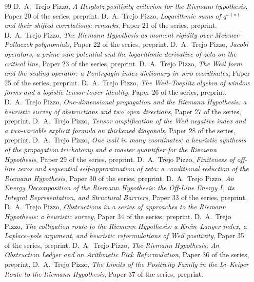 \documentclass[11pt]{amsart}
\theoremstyle{definition}
\theoremstyle{remark}
\numberwithin{equation}{section}
\begin{document}
\begin{thebibliography}{99}
 D.~A.~Trejo Pizzo, \emph{A Herglotz positivity criterion for the Riemann hypothesis}, Paper 20 of the series, preprint.
 D.~A.~Trejo Pizzo, \emph{Logarithmic sums of $q^{\omega(n)}$ and their shifted correlations: remarks}, Paper 21 of the series, preprint.
 D.~A.~Trejo Pizzo, \emph{The Riemann Hypothesis as moment rigidity over Meixner--Pollaczek polynomials}, Paper 22 of the series, preprint.
 D.~A.~Trejo Pizzo, \emph{Jacobi operators, a prime-sum potential and the logarithmic derivative of zeta on the critical line}, Paper 23 of the series, preprint.
 D.~A.~Trejo Pizzo, \emph{The Weil form and the scaling operator: a Pontryagin-index dictionary in zero coordinates}, Paper 25 of the series, preprint.
 D.~A.~Trejo Pizzo, \emph{The Weil--Toeplitz algebra of window forms and a logistic tensor-tower identity}, Paper 26 of the series, preprint.
 D.~A.~Trejo Pizzo, \emph{One-dimensional propagation and the Riemann Hypothesis: a heuristic survey of obstructions and two open directions}, Paper 27 of the series, preprint.
 D.~A.~Trejo Pizzo, \emph{Tensor amplification of the Weil negative index and a two-variable explicit formula on thickened diagonals}, Paper 28 of the series, preprint.
 D.~A.~Trejo Pizzo, \emph{One wall in many coordinates: a heuristic synthesis of the propagation trichotomy and a master quantifier for the Riemann Hypothesis}, Paper 29 of the series, preprint.
 D.~A.~Trejo Pizzo, \emph{Finiteness of off-line zeros and sequential self-approximation of zeta: a conditional reduction of the Riemann Hypothesis}, Paper 30 of the series, preprint.
 D.~A.~Trejo Pizzo, \emph{An Energy Decomposition of the Riemann Hypothesis: the Off-Line Energy $I$, its Integral Representation, and Structural Barriers}, Paper 33 of the series, preprint.
 D.~A.~Trejo Pizzo, \emph{Obstructions in a series of approaches to the Riemann Hypothesis: a heuristic survey}, Paper 34 of the series, preprint.
 D.~A.~Trejo Pizzo, \emph{The colligation route to the Riemann Hypothesis: a Kre\u{\i}n--Langer index, a Laplace--pole argument, and heuristic reformulations of Weil positivity}, Paper 35 of the series, preprint.
 D.~A.~Trejo Pizzo, \emph{The Riemann Hypothesis: An Obstruction Ledger and an Arithmetic Pick Reformulation}, Paper 36 of the series, preprint.
 D.~A.~Trejo Pizzo, \emph{The Limits of the Positivity Family in the Li--Keiper Route to the Riemann Hypothesis}, Paper 37 of the series, preprint.

\end{thebibliography}
\end{document}
